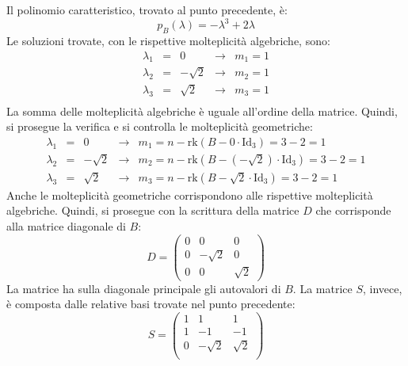 \documentclass[a4paper]{article}
\begin{document}
	\noindent
	Il polinomio caratteristico, trovato al punto precedente, è:
	\begin{equation*}
		p_{B}\left(\lambda\right) = -\lambda^{3} + 2\lambda
	\end{equation*}
	Le soluzioni trovate, con le rispettive molteplicità algebriche, sono:
	\begin{equation*}
		\begin{array}{rclcl}
			\lambda_{1} &=& 0			&\longrightarrow& m_{1} = 1 \\
			\lambda_{2} &=& -\sqrt{2}	&\longrightarrow& m_{2} = 1 \\
			\lambda_{3} &=& \sqrt{2}	&\longrightarrow& m_{3} = 1 \\
		\end{array}
	\end{equation*}
	La somma delle molteplicità algebriche è uguale all'ordine della matrice. Quindi, si prosegue la verifica e si controlla le molteplicità geometriche:
	\begin{equation*}
		\begin{array}{rclcl}
			\lambda_{1} &=& 0			&\longrightarrow& m_{1} = n - \mathrm{rk}\left(B - 0 \cdot \mathrm{Id}_{3}\right) = 3 - 2 = 1 \\ [.3em]
			\lambda_{2} &=& -\sqrt{2}	&\longrightarrow& m_{2} = n - \mathrm{rk}\left(B - \left(-\sqrt{2}\right) \cdot \mathrm{Id}_{3}\right) = 3 - 2 = 1 \\ [.3em]
			\lambda_{3} &=& \sqrt{2}	&\longrightarrow& m_{3} = n - \mathrm{rk}\left(B - \sqrt{2} \cdot \mathrm{Id}_{3}\right) = 3 - 2 = 1
		\end{array}
	\end{equation*}
	Anche le molteplicità geometriche corrispondono alle rispettive molteplicità algebriche. Quindi, si prosegue con la scrittura della matrice $D$ che corrisponde alla matrice diagonale di $B$:
	\begin{equation*}
		D = \begin{pmatrix}
			0 & 0 & 0 \\
			0 & -\sqrt{2} & 0 \\
			0 & 0 & \sqrt{2}
		\end{pmatrix}
	\end{equation*}
	La matrice ha sulla diagonale principale gli autovalori di $B$. La matrice $S$, invece, è composta dalle relative basi trovate nel punto precedente:
	\begin{equation*}
		S = \begin{pmatrix}
			1 & 1			& 1			\\
			1 & -1			& -1		\\
			0 & -\sqrt{2}	& \sqrt{2}	\\
		\end{pmatrix}
	\end{equation*}
\end{document}
